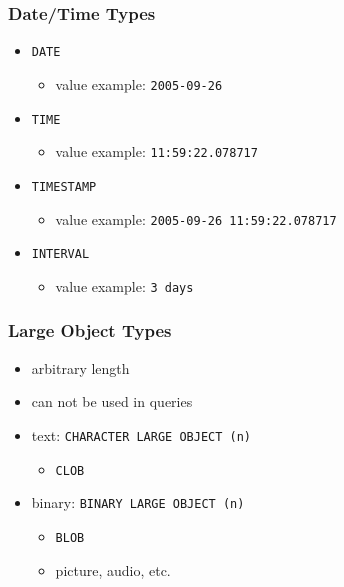 \documentclass[dvipsnames]{beamer}
\theoremstyle{plain}
\begin{document}
\begin{frame}
  \frametitle{Date/Time Types}

  \begin{itemize}
    \item \lstinline!DATE!
    \begin{itemize}
      \item value example: \texttt{2005-09-26}
    \end{itemize}

    \pause
    \medskip
    \item \lstinline!TIME!
    \begin{itemize}
      \item value example: \texttt{11:59:22.078717}
    \end{itemize}

    \pause
    \medskip
    \item \lstinline!TIMESTAMP!
    \begin{itemize}
      \item value example: \texttt{2005-09-26 11:59:22.078717}
    \end{itemize}

    \pause
    \medskip
    \item \lstinline!INTERVAL!
    \begin{itemize}
      \item value example: \texttt{3 days}
    \end{itemize}
  \end{itemize}
\end{frame}

\begin{frame}
  \frametitle{Large Object Types}

  \begin{itemize}
    \item arbitrary length
    \item can not be used in queries

    \pause
    \bigskip
    \item text: \lstinline!CHARACTER LARGE OBJECT (n)!
    \begin{itemize}
      \item \lstinline!CLOB!
    \end{itemize}

    \pause
    \item binary: \lstinline!BINARY LARGE OBJECT (n)!
    \begin{itemize}
      \item \lstinline!BLOB!
      \item picture, audio, etc.
    \end{itemize}
  \end{itemize}
\end{frame}
\end{document}
